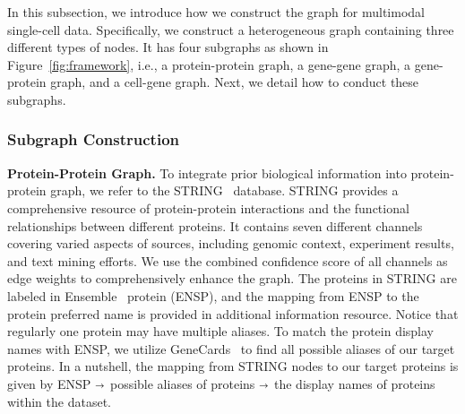 


In this subsection, we introduce how we construct the graph for multimodal single-cell data. Specifically, we construct a heterogeneous graph containing three different types of nodes. It has four subgraphs as shown in Figure~\ref{fig:framework}, i.e., a protein-protein graph, a gene-gene graph, a gene-protein graph, and a cell-gene graph. Next, we detail how to conduct these subgraphs. 

\subsubsection{Subgraph Construction}\label{sec:subgraph} 

\noindent \textbf{Protein-Protein Graph.} 
To integrate prior biological information into protein-protein graph, we refer to the STRING~\cite{szklarczyk2023string} database. STRING provides a comprehensive resource of protein-protein interactions and the functional relationships between different proteins. It contains seven different channels covering varied aspects of sources, including genomic context, experiment results, and text mining efforts. We use the combined confidence score of all channels as edge weights to comprehensively enhance the graph. The proteins in STRING are labeled in Ensemble~\cite{cunningham2022ensembl} protein (ENSP), and the mapping from ENSP to the protein preferred name is provided in additional information resource. Notice that regularly one protein may have multiple aliases. To match the protein display names with ENSP, we utilize GeneCards~\cite{stelzer2016genecards} to find all possible aliases of our target proteins. In a nutshell, the mapping from STRING nodes to our target proteins is given by ENSP $\shortrightarrow$ possible aliases of proteins $\shortrightarrow$ the display names of proteins within the dataset.


